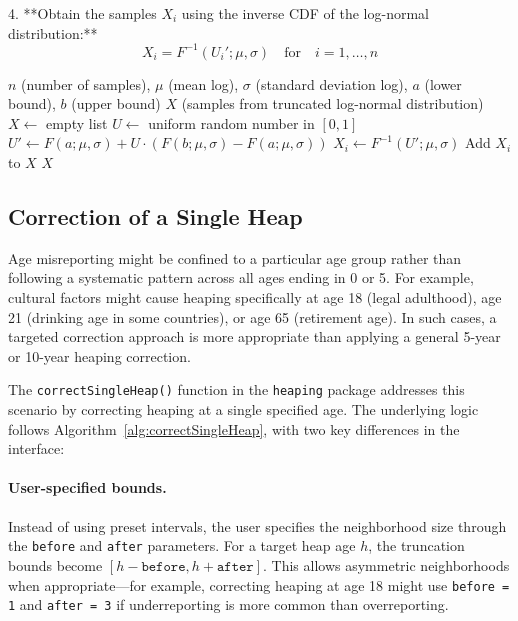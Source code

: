 \documentclass[pdflatex,sn-mathphys-num]{sn-jnl}%
\theoremstyle{thmstyleone}%
\theoremstyle{thmstyletwo}%
\theoremstyle{thmstylethree}%
\begin{document}
4. **Obtain the samples \( X_i \) using the inverse CDF of the log-normal distribution:**
   \[
   X_i = F^{-1}(U_i'; \mu, \sigma) \quad \text{for} \quad i = 1, \ldots, n
   \]


\begin{algorithm}
\caption{Generate Truncated Log-Normal Samples}\label{alg:truncatedLogNormal}
\begin{algorithmic}[1]
\Require $n$ (number of samples), $\mu$ (mean log), $\sigma$ (standard deviation log), $a$ (lower bound), $b$ (upper bound)
\Ensure $X$ (samples from truncated log-normal distribution)
\State $X \gets$ empty list
    \State $U \gets$ uniform random number in $[0, 1]$
    \State $U' \gets F(a; \mu, \sigma) + U \cdot (F(b; \mu, \sigma) - F(a; \mu, \sigma))$
    \State $X_i \gets F^{-1}(U'; \mu, \sigma)$
    \State Add $X_i$ to $X$
\EndFor
\State \Return $X$
\end{algorithmic}
\end{algorithm}


\subsection{Correction of a Single Heap}

Age misreporting might be confined to a particular age group rather than following a systematic pattern across all ages ending in 0 or 5. For example, cultural factors might cause heaping specifically at age 18 (legal adulthood), age 21 (drinking age in some countries), or age 65 (retirement age). In such cases, a targeted correction approach is more appropriate than applying a general 5-year or 10-year heaping correction.

The \texttt{correctSingleHeap()} function in the \texttt{heaping} package addresses this scenario by correcting heaping at a single specified age. The underlying logic follows Algorithm~\ref{alg:correctSingleHeap}, with two key differences in the interface:

\paragraph{User-specified bounds.} Instead of using preset intervals, the user specifies the neighborhood size through the \texttt{before} and \texttt{after} parameters. For a target heap age $h$, the truncation bounds become $[h - \texttt{before}, h + \texttt{after}]$. This allows asymmetric neighborhoods when appropriate---for example, correcting heaping at age 18 might use \texttt{before = 1} and \texttt{after = 3} if underreporting is more common than overreporting.
\end{document}
